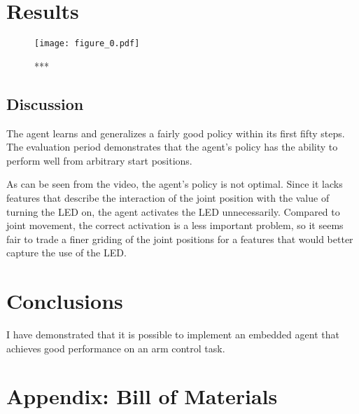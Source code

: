 \documentclass{article}
\begin{document}
	
	\section{Results}

	
		\begin{figure}[h]
			\begin{center}
				\texttt{[image: figure\_0.pdf]}
				\caption{***}
			\end{center}
		\end{figure}
		
	\subsection{Discussion}

	The agent learns and generalizes a fairly good policy within its first fifty steps. The evaluation period demonstrates that the agent's policy has the ability to perform well from arbitrary start positions.
	
	As can be seen from the video, the agent's policy is not optimal. Since it lacks features that describe the interaction of the joint position with the value of turning the LED on, the agent activates the LED unnecessarily. Compared to joint movement, the correct activation is a less important problem, so it seems fair to trade a finer griding of the joint positions for a features that would better capture the use of the LED.
	

	
	\section{Conclusions}

	I have demonstrated that it is possible to implement an embedded agent that achieves good performance on an arm control task.
	
	\section{Appendix: Bill of Materials}
	
\end{document}
